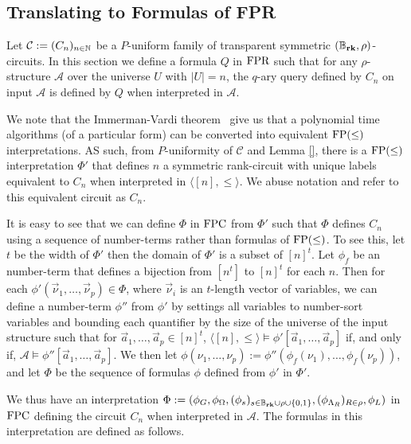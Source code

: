 \documentclass[../paper.tex]{subfiles}
\begin{document}
\subsection{Translating to Formulas of FPR}
\label{sec:translating-formulas-to-FPR}
Let $\mathcal{C}:= (C_n)_{n \in \mathbb{N}}$ be a $P$-uniform family of transparent
symmetric $(\mathbb{B}_{\text{\textbf{rk}}}, \rho)$-circuits. In this section we define a formula $Q$ in
$\text{\upshape FPR}$ such that for any $\rho$-structure $\mathcal{A}$ over the universe $U$
with $\vert U \vert = n$, the $q$-ary query defined by $C_n$ on input
$\mathcal{A}$ is defined by $Q$ when interpreted in $\mathcal{A}$.

We note that the Immerman-Vardi theorem~\cite{} give us that a polynomial time
algorithms (of a particular form) can be converted into equivalent $\text{\upshape FP}(\leq)$
interpretations. AS such, from $P$-uniformity of $\mathcal{C}$ and Lemma \ref{},
there is a $\text{\upshape FP}(\leq)$ interpretation $\Phi'$ that defines $n$ a symmetric
rank-circuit with unique labels equivalent to $C_n$ when interpreted in $\langle
[n], \leq \rangle$. We abuse notation and refer to this equivalent circuit as
$C_n$.

It is easy to see that we can define $\Phi$ in $\text{\upshape FPC}$ from $\Phi'$ such that
$\Phi$ defines $C_n$ using a sequence of number-terms rather than formulas of
$\text{\upshape FP}(\leq)$. To see this, let $t$ be the width of $\Phi'$ then the domain of
$\Phi'$ is a subset of $[n]^t$. Let $\phi_f$ be an number-term that defines a
bijection from $[n^t]$ to $[n]^t$ for each $n$. Then for each $\phi'
(\vec{\nu}_1, \ldots, \vec{\nu}_{p}) \in \Phi$, where $\vec{\nu}_i$ is an
$t$-length vector of variables, we can define a number-term $\phi''$ from
$\phi'$ by settings all variables to number-sort variables and bounding each
quantifier by the size of the universe of the input structure such that for
$\vec{a}_1, \ldots, \vec{a}_p \in [n]^t$, $\langle [n], \leq \rangle \models
\phi' [\vec{a}_1, \ldots, \vec{a}_p]$ if, and only if, $\mathcal{A} \models
\phi'' [\vec{a}_1, \ldots, \vec{a}_p]$. We then let $\phi(\nu_1, \ldots, \nu_p)
:= \phi''(\phi_f (\nu_1), \ldots, \phi_f(\nu_p))$, and let $\Phi$ be the
sequence of formulas $\phi$ defined from $\phi'$ in $\Phi'$.

We thus have an interpretation $\Phi := (\phi_G, \phi_\Omega, (\phi_s)_{ s \in
	\mathbb{B}_{\text{\textbf{rk}}} \cup \rho \cup \{0,1\}}, (\phi_{\Lambda_R})_{R \in \rho}, \phi_L)$ in
$\text{\upshape FPC}$ defining the circuit $C_n$ when interpreted in $\mathcal{A}$. The
formulas in this interpretation are defined as follows.
\end{document}
